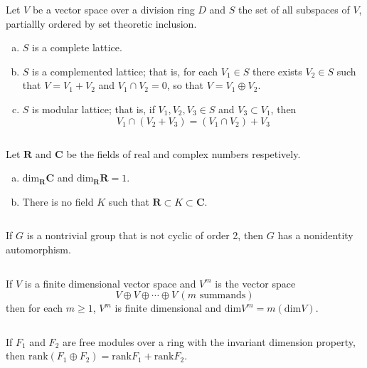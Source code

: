 $$ $$

\begin{ex}
    Let $V$ be a vector space over a division ring $D$ and $S$ the set of all subspaces of $V$, partiallly ordered by set theoretic inclusion.
    \begin{enumerate}[(a)]
        \item $S$ is a complete lattice.
        \item $S$ is a complemented lattice; that is, for each $V_{1}\in S$ there exists $V_{2}\in S$ such that $V=V_{1}+V_{2}$ and $V_{1}\cap V_{2}=0$, so that $V=V_{1}\oplus V_{2}$.
        \item $S$ is modular lattice; that is, if $V_{1}, V_{2}, V_{3}\in S$ and $V_{3}\subset V_{1}$, then \[V_{1}\cap (V_{2}+V_{3})=(V_{1}\cap V_{2})+V_{3}\]
    \end{enumerate}
\end{ex}

$$ $$

\begin{ex}
    Let $\mathbf{R}$ and $\mathbf{C}$ be the fields of real and complex numbers respetively.
    \begin{enumerate}[(a)]
        \item $\mathrm{dim}_{\mathbf{R}}\mathbf{C}$ and $\mathrm{dim}_{\mathbf{R}}\mathbf{R}=1$.
        \item There is no field $K$ such that $\mathbf{R}\subset K\subset\mathbf{C}$.
    \end{enumerate}
\end{ex}

$$ $$

\begin{ex}
    If $G$ is a nontrivial group that is not cyclic of order 2, then $G$ has a nonidentity automorphism.
\end{ex}

$$ $$

\begin{ex}
    If $V$ is a finite dimensional vector space and $V^{m}$ is the vector space\[V\oplus V\oplus\cdots\oplus V \,(m \text{ summands})\] then for each $m\geq 1$, $V^{m}$ is finite dimensional and $\mathrm{dim} V^{m}=m(\mathrm{dim}V)$.
\end{ex}

$$ $$

\begin{ex}
    If $F_{1}$ and $F_{2}$ are free modules over a ring with the invariant dimension property, then $\mathrm{rank}(F_{1}\oplus F_{2})=\mathrm{rank}F_{1}+\mathrm{rank}F_{2}$.
\end{ex}

